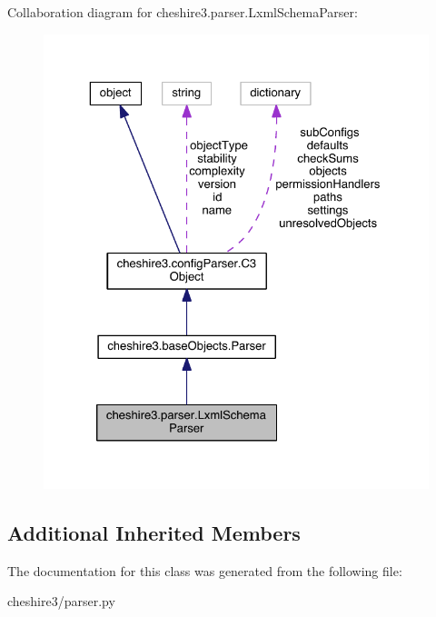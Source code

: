 Collaboration diagram for cheshire3.\-parser.\-Lxml\-Schema\-Parser\-:
\nopagebreak
\begin{figure}[H]
\begin{center}
\leavevmode
\includegraphics[width=325pt]{classcheshire3_1_1parser_1_1_lxml_schema_parser__coll__graph}
\end{center}
\end{figure}
\subsection*{Additional Inherited Members}


The documentation for this class was generated from the following file\-:\begin{DoxyCompactItemize}
\item 
cheshire3/parser.\-py\end{DoxyCompactItemize}
